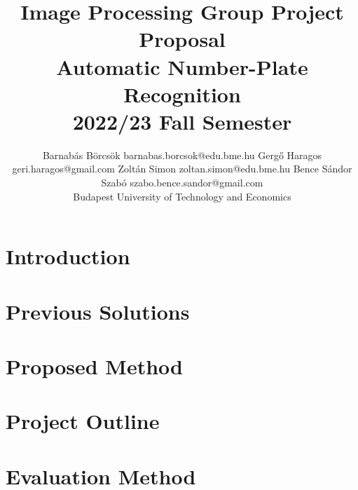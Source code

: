 \documentclass[twoside,11pt]{article}
\begin{document}
\title{
    Image Processing Group Project Proposal\\
    Automatic Number-Plate Recognition\\
    2022/23 Fall Semester
}

\author{\name Barnabás Börcsök
    \email barnabas.borcsok@edu.bme.hu
    \AND
    \name Gergő Haragos
    \email geri.haragos@gmail.com
   \AND
    \name Zoltán Simon
    \email zoltan.simon@edu.bme.hu
   \AND
    \name Bence Sándor Szabó 
    \email szabo.bence.sandor@gmail.com
   \\\vfill\hfill\addr Budapest University of Technology and Economics
}

\maketitle

\section{Introduction}


\section{Previous Solutions}


\section{Proposed Method}


\section{Project Outline}


\section{Evaluation Method}



\newpage

\newpage
\end{document}
